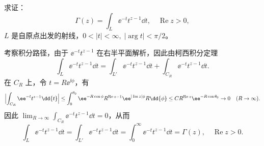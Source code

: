 \begin{question}
求证：
\[
\Gamma(z)=\int_L \ee^{-t} t^{z-1}\dd{t},\quad \operatorname{Re} z>0,
\]
\(L\) 是自原点出发的射线，\(0<|t|<\infty,\;|\arg t|<\pi/2\)。

\begin{solution}
\begin{center}
\end{center}
考察积分路径，由于 \(\ee^{-t} t^{z-1}\) 在右半平面解析，因此由柯西积分定理
\[
\int_L \ee^{-t} t^{z-1}\dd{t}
= \int_{L'} \ee^{-t} t^{z-1}\dd{t} + \int_{C_R} \ee^{-t} t^{z-1}\dd{t}.
\]
在 \(C_R\) 上，令 \(t=R\ee^{\ii\phi}\)，有
\[
\Bigl|\int_{C_R} \ee^{-t} t^{z-1}\dd{t}\Bigr|
\le \int_{0}^{\theta_0} \ee^{-R\cos\phi} R^{\operatorname{Re}z-1} \ee^{|\operatorname{Im}z|\phi} R\dd{\phi}
\le C R^{\operatorname{Re}z} \ee^{-R\cos\theta_0} \to 0 \quad (R\to\infty).
\]
因此 \(\displaystyle\lim_{R\to\infty}\int_{C_R} \ee^{-t} t^{z-1}\dd{t}=0\)，从而
\[
\int_L \ee^{-t} t^{z-1}\dd{t} = \int_{L'} \ee^{-t} t^{z-1}\dd{t}
= \int_0^\infty \ee^{-t} t^{z-1}\dd{t} = \Gamma(z),\quad \operatorname{Re}z>0.
\]
\end{solution}
\end{question}
